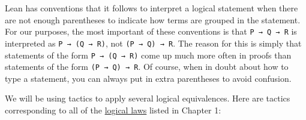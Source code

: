 \documentclass[
  letterpaper,
  DIV=11,
  numbers=noendperiod]{scrreprt}
\theoremstyle{remark}
\begin{document}
Lean has conventions that it follows to interpret a logical statement
when there are not enough parentheses to indicate how terms are grouped
in the statement. For our purposes, the most important of these
conventions is that \texttt{P\ →\ Q\ →\ R} is interpreted as
\texttt{P\ →\ (Q\ →\ R)}, not \texttt{(P\ →\ Q)\ →\ R}. The reason for
this is simply that statements of the form \texttt{P\ →\ (Q\ →\ R)} come
up much more often in proofs than statements of the form
\texttt{(P\ →\ Q)\ →\ R}. Of course, when in doubt about how to type a
statement, you can always put in extra parentheses to avoid confusion.

We will be using tactics to apply several logical equivalences. Here are
tactics corresponding to all of the
\protect\hyperlink{prop-laws}{logical laws} listed in Chapter 1:
\end{document}
